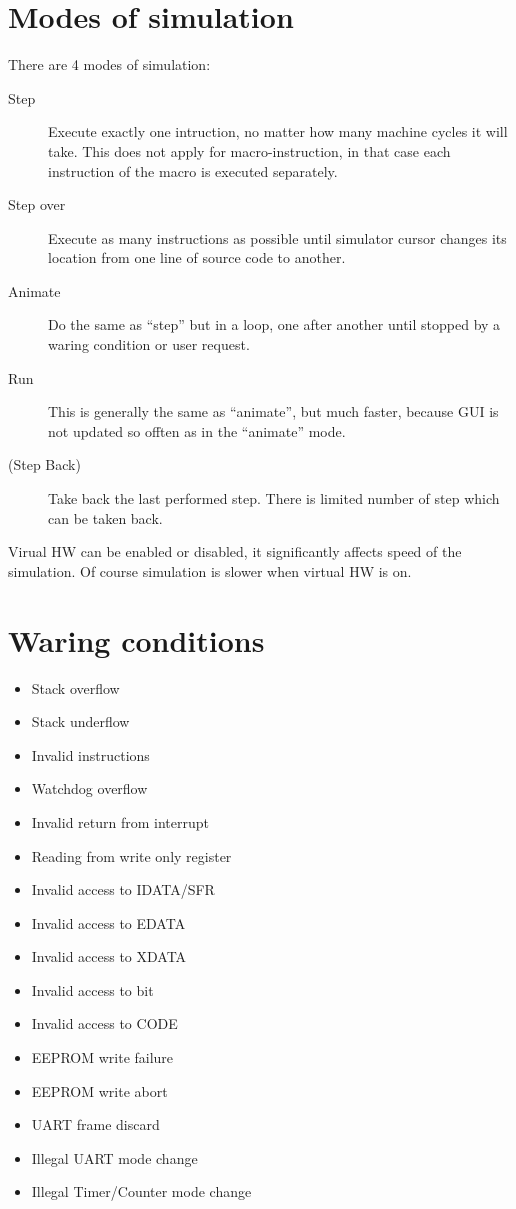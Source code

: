 \documentclass[a4paper,twoside,12pt]{book}
\begin{document}
	\section{Modes of simulation}
		There are 4 modes of simulation:
		\begin{description}
			\item[Step]
				Execute exactly one intruction, no matter how many machine cycles it will take. This does not apply for macro-instruction, in that case each instruction of the macro is executed separately.
			\item[Step over]
				Execute as many instructions as possible until simulator cursor changes its location from one line of source code to another.
			\item[Animate]
				Do the same as ``step'' but in a loop, one after another until stopped by a waring condition or user request.
			\item[Run]
				This is generally the same as ``animate'', but much faster, because GUI is not updated so offten as in the ``animate'' mode.
			\item[(Step Back)]
				Take back the last performed step. There is limited number of step which can be taken back.
		\end{description}

		Virual HW can be enabled or disabled, it significantly affects speed of the simulation. Of course simulation is slower when virtual HW is on.

	\section{Waring conditions}
		\begin{itemize}
			\setlength{\itemsep}{-3pt}
			\item Stack overflow
			\item Stack underflow
			\item Invalid instructions
			\item Watchdog overflow
			\item Invalid return from interrupt
			\item Reading from write only register
			\item Invalid access to IDATA/SFR
			\item Invalid access to EDATA
			\item Invalid access to XDATA
			\item Invalid access to bit
			\item Invalid access to CODE
			\item EEPROM write failure
			\item EEPROM write abort
			\item UART frame discard
			\item Illegal UART mode change
			\item Illegal Timer/Counter mode change
		\end{itemize}
\end{document}
